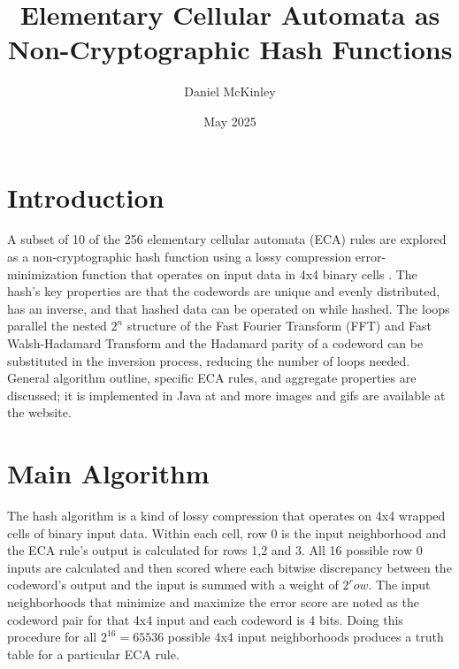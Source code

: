 \documentclass[11pt]{article}
\title{Elementary Cellular Automata as Non-Cryptographic Hash Functions}
\date{May 2025}
\author{Daniel McKinley}
\begin{document}
\maketitle

\section{Introduction}

A subset of 10 of the 256 elementary cellular automata (ECA) rules are explored as a non-cryptographic hash function using a lossy compression error-minimization function that operates on input data in 4x4 binary cells \cite{Wolfram}. The hash's key properties are that the codewords are unique and evenly distributed, has an inverse, and that hashed data can be operated on while hashed.  The loops parallel the nested $2^n$ structure of the Fast Fourier Transform (FFT) and Fast Walsh-Hadamard Transform and the Hadamard parity of a codeword can be substituted in the inversion process, reducing the number of loops needed. General algorithm outline, specific ECA rules, and aggregate properties are discussed; it is implemented in Java at \cite{mygit} and more images and gifs are available at the website.\\

\section{Main Algorithm}

The hash algorithm is a kind of lossy compression that operates on 4x4 wrapped cells of binary input data. Within each cell, row 0 is the input neighborhood and the ECA rule's output is calculated for rows 1,2 and 3. All 16 possible row 0 inputs are calculated and then scored where each bitwise discrepancy between the codeword's output and the input is summed with a weight of $2^row$. The input neighborhoods that minimize and maximize the error score are noted as the codeword pair for that 4x4 input and each codeword is 4 bits. Doing this procedure for all  $2^{16}=65536$ possible 4x4 input neighborhoods produces a truth table for a particular ECA rule.\\
\end{document}
